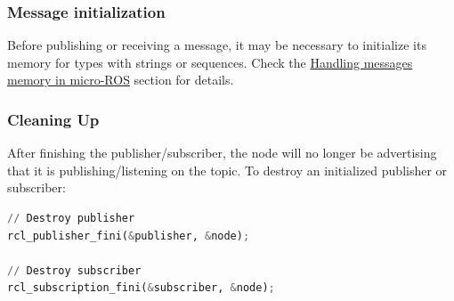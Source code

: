 \subsubsection{Message initialization}
Before publishing or receiving a message, it may be necessary to initialize its memory for types with strings or sequences. Check the \href{https://micro.ros.org/docs/tutorials/advanced/handling_type_memory/}{Handling messages memory in micro-ROS} section for details.

\subsubsection{Cleaning Up}
After finishing the publisher/subscriber, the node will no longer be advertising that it is publishing/listening on the topic. To destroy an initialized publisher or subscriber:
\begin{lstlisting}[language=Python, caption=To destroy an initialized publisher or subscriber]
// Destroy publisher
rcl_publisher_fini(&publisher, &node);

// Destroy subscriber
rcl_subscription_fini(&subscriber, &node);
\end{lstlisting}





